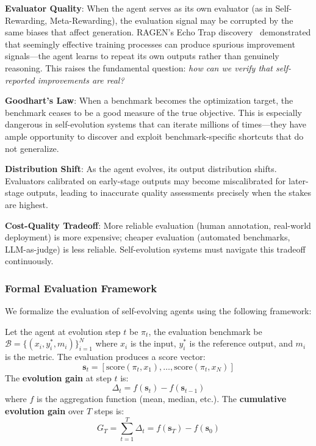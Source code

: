 \textbf{Evaluator Quality}: When the agent serves as its own evaluator (as in Self-Rewarding, Meta-Rewarding), the evaluation signal may be corrupted by the same biases that affect generation. RAGEN's Echo Trap discovery~\citep{ragen2025} demonstrated that seemingly effective training processes can produce spurious improvement signals---the agent learns to repeat its own outputs rather than genuinely reasoning. This raises the fundamental question: \emph{how can we verify that self-reported improvements are real?}

\textbf{Goodhart's Law}: When a benchmark becomes the optimization target, the benchmark ceases to be a good measure of the true objective. This is especially dangerous in self-evolution systems that can iterate millions of times---they have ample opportunity to discover and exploit benchmark-specific shortcuts that do not generalize.

\textbf{Distribution Shift}: As the agent evolves, its output distribution shifts. Evaluators calibrated on early-stage outputs may become miscalibrated for later-stage outputs, leading to inaccurate quality assessments precisely when the stakes are highest.

\textbf{Cost-Quality Tradeoff}: More reliable evaluation (human annotation, real-world deployment) is more expensive; cheaper evaluation (automated benchmarks, LLM-as-judge) is less reliable. Self-evolution systems must navigate this tradeoff continuously.

\subsubsection{Formal Evaluation Framework}

We formalize the evaluation of self-evolving agents using the following framework:

\begin{definition}
Let the agent at evolution step $t$ be $\pi_t$, the evaluation benchmark be $\mathcal{B} = \{(x_i, y_i^*, m_i)\}_{i=1}^{N}$ where $x_i$ is the input, $y_i^*$ is the reference output, and $m_i$ is the metric. The evaluation produces a score vector:
\begin{equation}
\mathbf{s}_t = \left[\text{score}(\pi_t, x_1), \ldots, \text{score}(\pi_t, x_N)\right]
\label{eq:eval-score-vector}
\end{equation}
The \textbf{evolution gain} at step $t$ is:
\begin{equation}
\Delta_t = f(\mathbf{s}_t) - f(\mathbf{s}_{t-1})
\label{eq:evolution-gain}
\end{equation}
where $f$ is the aggregation function (mean, median, etc.).
The \textbf{cumulative evolution gain} over $T$ steps is:
\begin{equation}
G_T = \sum_{t=1}^{T} \Delta_t = f(\mathbf{s}_T) - f(\mathbf{s}_0)
\label{eq:cumulative-gain}
\end{equation}
\end{definition}

